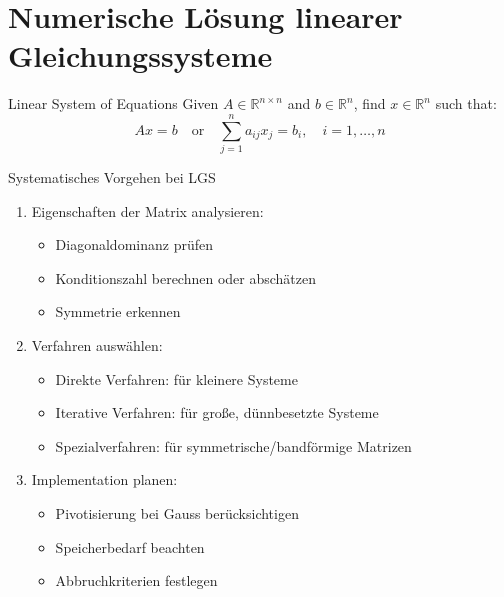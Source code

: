 

\section{Numerische Lösung linearer Gleichungssysteme}

\begin{definition}{Linear System of Equations}
Given $A \in \mathbb{R}^{n\times n}$ and $b \in \mathbb{R}^n$, find $x \in \mathbb{R}^n$ such that:
$$Ax = b \quad \text{or} \quad \sum_{j=1}^n a_{ij}x_j = b_i, \quad i=1,\ldots,n$$
\end{definition}

\begin{KR}{Systematisches Vorgehen bei LGS}
\begin{enumerate}
    \item Eigenschaften der Matrix analysieren:
    \begin{itemize}
        \item Diagonaldominanz prüfen
        \item Konditionszahl berechnen oder abschätzen
        \item Symmetrie erkennen
    \end{itemize}
    
    \item Verfahren auswählen:
    \begin{itemize}
        \item Direkte Verfahren: für kleinere Systeme
        \item Iterative Verfahren: für große, dünnbesetzte Systeme
        \item Spezialverfahren: für symmetrische/bandförmige Matrizen
    \end{itemize}
    
    \item Implementation planen:
    \begin{itemize}
        \item Pivotisierung bei Gauss berücksichtigen
        \item Speicherbedarf beachten
        \item Abbruchkriterien festlegen
    \end{itemize}
\end{enumerate}
\end{KR}

